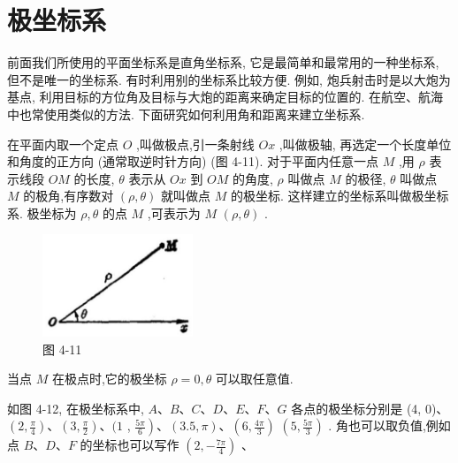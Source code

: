 \documentclass[lang=cn,newtx,10pt,scheme=chinese]{elegantbook}
\begin{document}
\section{极坐标系}

前面我们所使用的平面坐标系是直角坐标系, 它是最简单和最常用的一种坐标系, 但不是唯一的坐标系. 有时利用别的坐标系比较方便. 例如, 炮兵射击时是以大炮为基点, 利用目标的方位角及目标与大炮的距离来确定目标的位置的. 在航空、航海中也常使用类似的方法. 下面研究如何利用角和距离来建立坐标系.

在平面内取一个定点 \(O\) ,叫做极点,引一条射线 \({Ox}\) ,叫做极轴, 再选定一个长度单位和角度的正方向 (通常取逆时针方向) (图 4-11). 对于平面内任意一点 \(M\) ,用 \(\rho\) 表示线段 \({OM}\) 的长度, \(\theta\) 表示从 \({Ox}\) 到 \({OM}\) 的角度, \(\rho\) 叫做点 \(M\) 的极径, \(\theta\) 叫做点 \(M\) 的极角,有序数对 \(\left( {\rho ,\theta }\right)\) 就叫做点 \(M\) 的极坐标. 这样建立的坐标系叫做极坐标系. 极坐标为 \(\rho ,\theta\) 的点 \(M\) ,可表示为 \(M\) \(\left( {\rho ,\theta }\right)\) .

\begin{figure}[h]
  \centering
  \includegraphics[max width=0.4\textwidth]{images/01912cc2-ffb6-728e-9ae7-b113ff05c64b_174_107083.jpg}
  \caption{图 4-11}
\end{figure}



当点 \(M\) 在极点时,它的极坐标 \(\rho = 0,\theta\) 可以取任意值.

如图 4-12, 在极坐标系中, \(A\text{、}B\text{、}C\text{、}D\text{、}E\text{、}F\text{、}G\) 各点的极坐标分别是 (4, 0)、 \(\left( {2,\frac{\pi }{4}}\right) \text{、}\left( {3,\frac{\pi }{2}}\right) \text{、}(1\) , \(\left. \frac{5\pi }{6}\right) \text{、}\left( {{3.5},\pi }\right) \text{、}\left( {6,\frac{4\pi }{3}}\right)\) \(\left( {5,\frac{5\pi }{3}}\right)\) . 角也可以取负值,例如点 \(B\text{、}D\text{、}F\) 的坐标也可以写作 \(\left( {2, - \frac{7\pi }{4}}\right)\) 、
\end{document}
